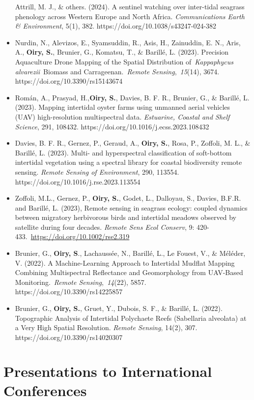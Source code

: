 \documentclass[
  letterpaper,
  11pt,
  english,
  singlespacing,
  headsepline]{MastersDoctoralThesis}
\begin{document}
\begin{itemize}
  Attrill, M. J., \& others. (2024). A sentinel watching over
  inter-tidal seagrass phenology across Western Europe and North Africa.
  \emph{Communications Earth \& Environment}, 5(1), 382.
  https://doi.org/10.1038/s43247-024-382
\item
  Nurdin, N., Alevizos, E., Syamsuddin, R., Asis, H., Zainuddin, E. N.,
  Aris, A., \textbf{Oiry, S.}, Brunier, G., Komatsu, T., \& Barillé, L.
  (2023). Precision Aquaculture Drone Mapping of the Spatial
  Distribution of~\emph{Kappaphycus alvarezii}~Biomass and
  Carrageenan.~\emph{Remote Sensing},~\emph{15}(14), 3674.
  https://doi.org/10.3390/rs15143674
\item
  Román, A., Prasyad, H.,\textbf{Oiry, S.}, Davies, B. F. R., Brunier,
  G., \& Barillé, L. (2023). Mapping intertidal oyster farms using
  unmanned aerial vehicles (UAV) high-resolution multispectral data.
  \emph{Estuarine, Coastal and Shelf Science}, 291, 108432.
  https://doi.org/10.1016/j.ecss.2023.108432
\item
  Davies, B. F. R., Gernez, P., Geraud, A., \textbf{Oiry, S.}, Rosa, P.,
  Zoffoli, M. L., \& Barillé, L. (2023). Multi- and hyperspectral
  classification of soft-bottom intertidal vegetation using a spectral
  library for coastal biodiversity remote sensing. \emph{Remote Sensing
  of Environment}, 290, 113554.
  https://doi.org/10.1016/j.rse.2023.113554
\item
  Zoffoli, M.L., Gernez, P., \textbf{Oiry, S.}, Godet, L., Dalloyau, S.,
  Davies, B.F.R. and Barillé, L. (2023), Remote sensing in seagrass
  ecology: coupled dynamics between migratory herbivorous birds and
  intertidal meadows observed by satellite during four decades.
  \emph{Remote Sens Ecol Conserv}, 9:
  420-433.~\url{https://doi.org/10.1002/rse2.319}
\item
  Brunier, G., \textbf{Oiry, S}., Lachaussée, N., Barillé, L., Le
  Fouest, V., \& Méléder, V. (2022). A Machine-Learning Approach to
  Intertidal Mudflat Mapping Combining Multispectral Reflectance and
  Geomorphology from UAV-Based Monitoring.~\emph{Remote
  Sensing},~\emph{14}(22), 5857. https://doi.org/10.3390/rs14225857
\item
  Brunier, G., \textbf{Oiry, S.}, Gruet, Y., Dubois, S. F., \& Barillé,
  L. (2022). Topographic Analysis of Intertidal Polychaete Reefs
  (Sabellaria alveolata) at a Very High Spatial Resolution. \emph{Remote
  Sensing}, 14(2), 307. https://doi.org/10.3390/rs14020307
\end{itemize}

\section*{Presentations to International
Conferences}\label{presentations-to-international-conferences}
\end{document}
